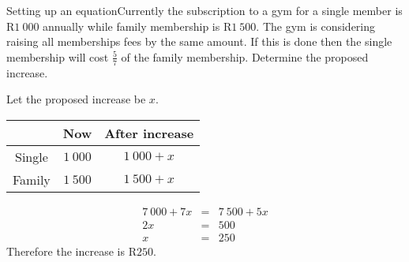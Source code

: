 \begin{wex}{Setting up an equation}{Currently the subscription to a gym for a single member is R$1~000$ annually while family membership is R$1~500$.  The gym is considering raising all memberships fees by the same amount.  If this is done then the single membership will cost $\frac{5}{7}$ of the family membership.  Determine the proposed increase.}{
Let the proposed increase be $x$.\\
\vspace{0.5cm}
\begin{center}
\begin{tabular}{|c|c|c|}\hline
& Now & After increase\\\hline
Single& $1~000$ & $1~000+x$\\\hline
Family& $1~500$ & $1~500+x$\\\hline
\end{tabular}
\end{center}
\begin{eqnarray*}
7~000 + 7x &=& 7~500  + 5x\\
2x &=& 500\\
x &=& 250
\end{eqnarray*}
Therefore the increase is R$250$.
}
\end{wex}

